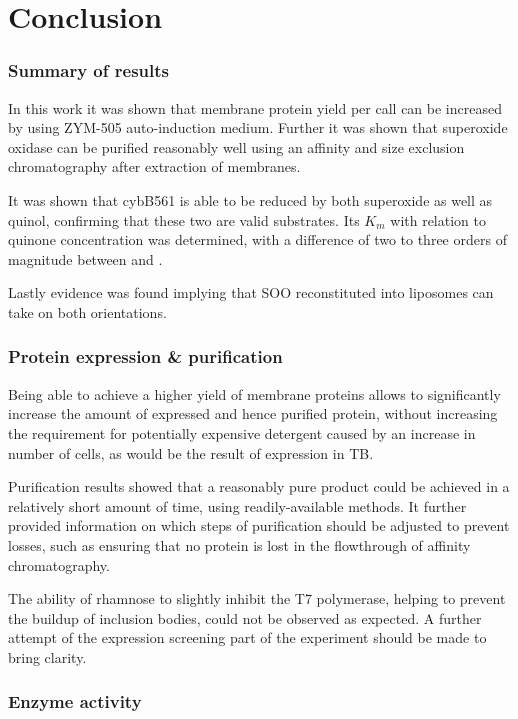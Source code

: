 \part{Conclusion}

\section{Summary of results}

In this work it was shown that membrane protein yield per call can be increased
by using ZYM-505 auto-induction medium. Further it was shown that superoxide
oxidase can be purified reasonably well using an affinity and size exclusion
chromatography after extraction of membranes.

It was shown that cybB561 is able to be reduced by both superoxide as well as
quinol, confirming that these two are valid substrates. Its $K_m$ with relation
to quinone concentration was determined, with a difference of two to three
orders of magnitude between \hs{} and \hsmut{}.

Lastly evidence was found implying that SOO reconstituted into liposomes can
take on both orientations.

\section{Protein expression \& purification}

Being able to achieve a higher yield of membrane proteins allows to
significantly increase the amount of expressed and hence purified protein,
without increasing the requirement for potentially expensive detergent caused
by an increase in number of cells, as would be the result of expression in
TB.\cite{memstar}

Purification results showed that a reasonably pure product could be achieved in
a relatively short amount of time, using readily-available methods. It further
provided information on which steps of purification should be adjusted to
prevent losses, such as ensuring that no protein is lost in the flowthrough of
affinity chromatography.

The ability of rhamnose to slightly inhibit the T7 polymerase, helping to
prevent the buildup of inclusion bodies, could not be observed as expected. A
further attempt of the expression screening part of the experiment should be
made to bring clarity.
\section{Enzyme activity}


